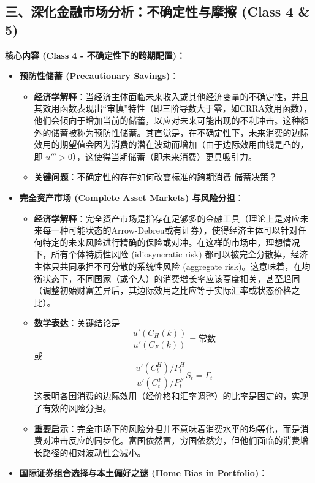 \documentclass[12pt]{article}
\begin{document}
\subsection*{三、深化金融市场分析：不确定性与摩擦 (Class 4 \& 5)}

\textbf{核心内容 (Class 4 - 不确定性下的跨期配置)：}
\begin{itemize}
    \item \textbf{预防性储蓄 (Precautionary Savings)}：
    \begin{itemize}
        \item \textbf{经济学解释}：当经济主体面临未来收入或其他经济变量的不确定性，并且其效用函数表现出“审慎”特性（即三阶导数大于零，如CRRA效用函数），他们会倾向于增加当前的储蓄，以应对未来可能出现的不利冲击。这种额外的储蓄被称为预防性储蓄。其直觉是，在不确定性下，未来消费的边际效用的期望值会因为消费的潜在波动而增加（由于边际效用曲线是凸的，即 $u''' > 0$），这使得当期储蓄（即未来消费）更具吸引力。
        \item \textbf{关键问题}：不确定性的存在如何改变标准的跨期消费-储蓄决策？
    \end{itemize}
    \item \textbf{完全资产市场 (Complete Asset Markets) 与风险分担}：
    \begin{itemize}
        \item \textbf{经济学解释}：完全资产市场是指存在足够多的金融工具（理论上是对应未来每一种可能状态的Arrow-Debreu或有证券），使得经济主体可以针对任何特定的未来风险进行精确的保险或对冲。在这样的市场中，理想情况下，所有个体特质性风险 (idiosyncratic risk) 都可以被完全分散掉，经济主体只共同承担不可分散的系统性风险 (aggregate risk)。这意味着，在均衡状态下，不同国家（或个人）的消费增长率应该高度相关，甚至趋同（调整初始财富差异后，其边际效用之比应等于实际汇率或状态价格之比）。
        \item \textbf{数学表达}：关键结论是
        \[
        \frac{u'(C_H(k))}{u'(C_F(k))} = \text{常数}
        \]
        或
        \[
        \frac{u'(C_t^H)/P_t^H}{u'(C_t^F)/P_t^F} S_t = \Gamma_t
        \]
        这表明各国消费的边际效用（经价格和汇率调整）的比率是固定的，实现了有效的风险分担。
        \item \textbf{重要启示}：完全市场下的风险分担并不意味着消费水平的均等化，而是消费对冲击反应的同步化。富国依然富，穷国依然穷，但他们面临的消费增长路径的相对波动性会减小。
    \end{itemize}
    \item \textbf{国际证券组合选择与本土偏好之谜 (Home Bias in Portfolio)}：
    \begin{itemize}

\end{itemize}
\end{itemize}
\end{document}
